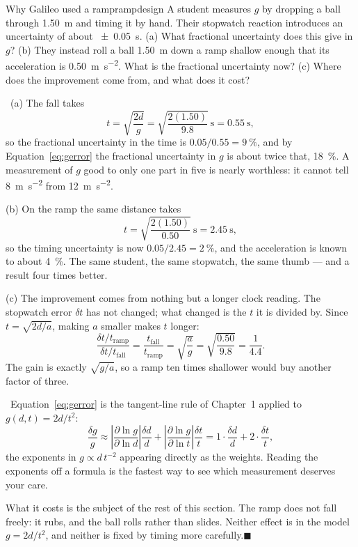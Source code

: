 \documentclass[11pt,twoside,openany]{book}
\newcommand{\viewtag}[3]{\fcolorbox{#2}{#3}{\footnotesize\textbf{\textcolor{#2}{#1}}}}
\newcommand{\elemtag}{\viewtag{Elementary}{elemcol}{elempale}}
\newcommand{\calctag}{\viewtag{Calculus}{calccol}{calcpale}}
\newcommand{\elem}{\par\medskip\noindent\elemtag\ }
\newcommand{\calc}{\par\medskip\noindent\calctag\ }
\newcommand{\qed}{\hfill$\blacksquare$}
\begin{document}
\begin{example}{Why Galileo used a ramp}{rampdesign}
A student measures $g$ by dropping a ball through \SI{1.50}{\metre} and timing it by hand. Their stopwatch reaction introduces an uncertainty of about \SI{\pm0.05}{\second}. (a) What fractional uncertainty does this give in $g$? (b) They instead roll a ball \SI{1.50}{\metre} down a ramp shallow enough that its acceleration is \SI{0.50}{\metre\per\second\squared}. What is the fractional uncertainty now? (c) Where does the improvement come from, and what does it cost?

\elem (a) The fall takes
\[
t = \sqrt{\frac{2d}{g}} = \sqrt{\frac{2(1.50)}{9.8}}\ \si{\second} = \SI{0.55}{\second},
\]
so the fractional uncertainty in the time is $0.05/0.55 = \SI{9}{\percent}$, and by Equation~\eqref{eq:gerror} the fractional uncertainty in $g$ is about twice that, \SI{18}{\percent}. A measurement of $g$ good to only one part in five is nearly worthless: it cannot tell \SI{8}{\metre\per\second\squared} from \SI{12}{\metre\per\second\squared}.

(b) On the ramp the same distance takes
\[
t = \sqrt{\frac{2(1.50)}{0.50}}\ \si{\second} = \SI{2.45}{\second},
\]
so the timing uncertainty is now $0.05/2.45 = \SI{2}{\percent}$, and the acceleration is known to about \SI{4}{\percent}. The same student, the same stopwatch, the same thumb --- and a result four times better.

(c) The improvement comes from nothing but a longer clock reading. The stopwatch error $\delta t$ has not changed; what changed is the $t$ it is divided by. Since $t = \sqrt{2d/a}$, making $a$ smaller makes $t$ longer:
\[
\frac{\delta t/t_{\text{ramp}}}{\delta t/t_{\text{fall}}} = \frac{t_{\text{fall}}}{t_{\text{ramp}}} = \sqrt{\frac{a}{g}} = \sqrt{\frac{0.50}{9.8}} = \frac{1}{4.4}.
\]
The gain is exactly $\sqrt{g/a}$, so a ramp ten times shallower would buy another factor of three.

\calc Equation~\eqref{eq:gerror} is the tangent-line rule of Chapter~1 applied to $g(d,t) = 2d/t^{2}$:
\[
\frac{\delta g}{g} \approx \left|\frac{\partial \ln g}{\partial \ln d}\right|\frac{\delta d}{d} + \left|\frac{\partial \ln g}{\partial \ln t}\right|\frac{\delta t}{t} = 1\cdot\frac{\delta d}{d} + 2\cdot\frac{\delta t}{t},
\]
the exponents in $g \propto d\,t^{-2}$ appearing directly as the weights. Reading the exponents off a formula is the fastest way to see which measurement deserves your care.

What it costs is the subject of the rest of this section. The ramp does not fall freely: it rubs, and the ball rolls rather than slides. Neither effect is in the model $g = 2d/t^{2}$, and neither is fixed by timing more carefully.\qed
\end{example}
\end{document}

